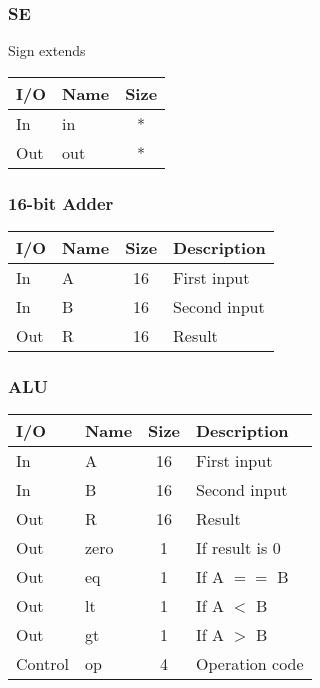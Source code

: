 		\subsubsection{SE}
			\begin{center} Sign extends \end{center}
			\begin{center} \begin{tabular}{| l | l | c |} \hline
				I/O & Name & Size \\ \hline
				In  & in   & * \\ \hline
				Out & out  & * \\ \hline
			\end{tabular} \end{center}
		\subsubsection{16-bit Adder}
			\begin{center} \begin{tabular}{| l | l | c | l |} \hline
				I/O & Name     & Size & Description \\ \hline
				In  & A        & 16   & First input \\ \hline
				In  & B        & 16   & Second input \\ \hline
				Out & R        & 16   & Result \\ \hline
			\end{tabular} \end{center}
		\subsubsection{ALU}
			\begin{center} \begin{tabular}{| l | l | c | l |} \hline
				I/O & Name     & Size & Description \\ \hline
				In  & A        & 16   & First input \\ \hline
				In  & B        & 16   & Second input \\ \hline
				Out & R        & 16   & Result \\ \hline
				Out & zero     & 1    & If result is 0 \\ \hline
				Out & eq       & 1    & If A $==$ B \\ \hline
				Out & lt       & 1    & If A $<$ B \\ \hline
				Out & gt       & 1    & If A $>$ B \\ \hline
				Control & op   & 4    & Operation code \\ \hline
			\end{tabular} \end{center}
